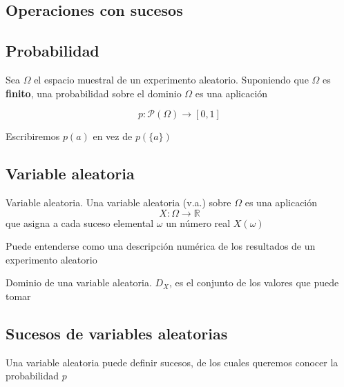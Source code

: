 \documentclass[
]{article}
\begin{document}
\hypertarget{operaciones-con-sucesos}{%
\subsection{Operaciones con sucesos}\label{operaciones-con-sucesos}}

\hypertarget{probabilidad}{%
\subsection{Probabilidad}\label{probabilidad}}

Sea \(\Omega\) el espacio muestral de un experimento aleatorio.
Suponiendo que \(\Omega\) es \textbf{finito}, una probabilidad sobre el
dominio \(\Omega\) es una aplicación

\[p: \mathcal{P}(\Omega)\longrightarrow [0,1]\]

Escribiremos \(p(a)\) en vez de \(p(\{a\})\)

\hypertarget{variable-aleatoria}{%
\subsection{Variable aleatoria}\label{variable-aleatoria}}

Variable aleatoria. Una variable aleatoria (v.a.) sobre \(\Omega\) es
una aplicación \[X: \Omega\longrightarrow \mathbb{R}\] que asigna a cada
suceso elemental \(\omega\) un número real \(X(\omega)\)

Puede entenderse como una descripción numérica de los resultados de un
experimento aleatorio

Dominio de una variable aleatoria. \(D_X\), es el conjunto de los
valores que puede tomar

\hypertarget{sucesos-de-variables-aleatorias}{%
\subsection{Sucesos de variables
aleatorias}\label{sucesos-de-variables-aleatorias}}

Una variable aleatoria puede definir sucesos, de los cuales queremos
conocer la probabilidad \(p\)
\end{document}
